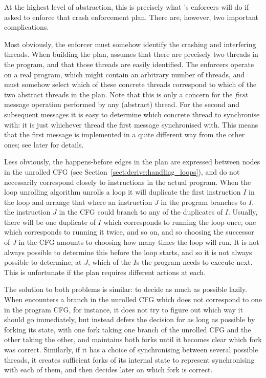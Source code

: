 At the highest level of abstraction, this is precisely what
{\implementation}'s enforcers will do if asked to enforce that crash
enforcement plan.  There are, however, two important complications.

Most obviously, the enforcer must somehow identify the crashing and
interfering threads.  When building the plan, {\technique} assumes
that there are precisely two threads in the program, and that those
threads are easily identified.  The enforcers operate on a real
program, which might contain an arbitrary number of threads, and must
somehow select which of these concrete threads correspond to which of
the two abstract threads in the plan.  Note that this is only a
concern for the \emph{first} message operation performed by any
(abstract) thread.  For the second and subsequent messages it is easy
to determine which concrete thread to synchronise with: it is just
whichever thread the first message synchronised with.  This means that
the first message is implemented in a quite different way from the
other ones; see later for details.

Less obviously, the happens-before edges in the plan are expressed
between nodes in the unrolled CFG (see
Section~\ref{sect:derive:handling_loops}), and do not necessarily
correspond closely to instructions in the actual program.  When the
loop unrolling algorithm unrolls a loop it will duplicate the first
instruction $I$ in the loop and arrange that where an instruction $J$
in the program branches to $I$, the instruction $J$ in the CFG could
branch to any of the duplicates of $I$.  Usually, there will be one
duplicate of $I$ which corresponds to running the loop once, one which
corresponds to running it twice, and so on, and so choosing the
successor of $J$ in the CFG amounts to choosing how many times the
loop will run.  It is not always possible to determine this before the
loop starts, and so it is not always possible to determine, at $J$,
which of the $I$s the program needs to execute next.  This is
unfortunate if the plan requires different actions at each.

The solution to both problems is similar: to decide as much as
possible lazily.  When {\implementation} encounters a branch in the
unrolled CFG which does not correspond to one in the program CFG, for
instance, it does not try to figure out which way it should go
immediately, but instead defers the decision for as long as possible
by forking its state, with one fork taking one branch of the unrolled
CFG and the other taking the other, and maintains both forks until it
becomes clear which fork was correct.  Similarly, if it has a choice
of synchronising between several possible threads, it creates
sufficient forks of its internal state to represent synchronising with
each of them, and then decides later on which fork is correct.

